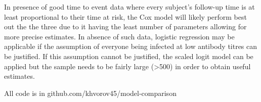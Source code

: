 \documentclass[12pt]{article}
\begin{document}
In presence of good time to event data where every subject's follow-up time is at least proportional to their time at risk, the Cox model will likely perform best out the the three due to it having the least number of parameters allowing for more precise estimates. In absence of such data, logistic regression may be applicable if the assumption of everyone being infected at low antibody titres can be justified. If this assumption cannot be justified, the scaled logit model can be applied but the sample needs to be fairly large (>500) in order to obtain useful estimates.

\pagebreak

All code is in github.com/khvorov45/model-comparison
\end{document}
